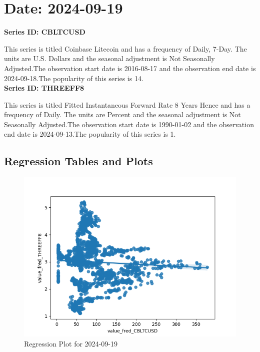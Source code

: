 \section{Date: 2024-09-19}
\noindent \textbf{Series ID: CBLTCUSD} 

\noindent This series is titled Coinbase Litecoin and has a frequency of Daily, 7-Day. The units are U.S. Dollars and the seasonal adjustment is Not Seasonally Adjusted.The observation start date is 2016-08-17 and the observation end date is 2024-09-18.The popularity of this series is 14. \\ 

\noindent \textbf{Series ID: THREEFF8} 

\noindent This series is titled Fitted Instantaneous Forward Rate 8 Years Hence and has a frequency of Daily. The units are Percent and the seasonal adjustment is Not Seasonally Adjusted.The observation start date is 1990-01-02 and the observation end date is 2024-09-13.The popularity of this series is 1. \\ 

\subsection{Regression Tables and Plots}


\begin{figure}
\centering
\includegraphics[scale = 0.9]{plots/plot_2024-09-19.png}
\caption{Regression Plot for 2024-09-19}
\end{figure}
\newpage
